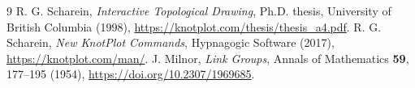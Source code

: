 \begin{thebibliography}{9}
 R. G. Scharein, \emph{Interactive Topological Drawing}, Ph.D. thesis, University of British Columbia (1998), \url{https://knotplot.com/thesis/thesis_a4.pdf}.
 R. G. Scharein, \emph{New KnotPlot Commands}, Hypnagogic Software (2017), \url{https://knotplot.com/man/}.
 J. Milnor, \emph{Link Groups}, Annals of Mathematics \textbf{59}, 177--195 (1954), \url{https://doi.org/10.2307/1969685}.
\end{thebibliography}
